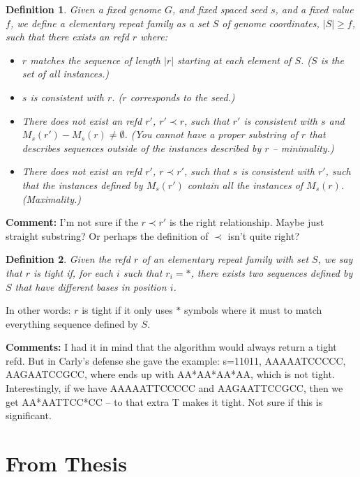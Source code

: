 \documentclass{article}
\newtheorem{definition}{Definition}
\begin{document}
\begin{definition}
  Given a fixed genome $G$, and fixed spaced seed
  $s$, and a fixed value $f$, we define a elementary repeat family as
  a set $S$ of genome coordinates, $|S| \geq f$, such that there
  exists an refd $r$ where:
  \begin{itemize}
  \item $r$ matches the sequence of length $|r|$ starting at each
    element of $S$.  ($S$ is the set of all instances.)
  \item $s$ is consistent with $r$.  ($r$ corresponds to the seed.)
  \item There does not exist an refd $r'$, $r' \prec r$,  such that $r'$
    is consistent with $s$ and $M_s(r') - M_s(r) \neq \emptyset$.  (You
    cannot have a proper substring of $r$ that describes sequences
    outside of the instances described by $r$ -- minimality.)
  \item There does not exist an refd $r'$, $r \prec r'$, such that $s$ is consistent
    with $r'$, such that the instances defined by $M_s(r')$ contain all the
    instances of $M_s(r)$.  (Maximality.)
  \end{itemize}
\end{definition}
 {\bf Comment:} I'm not sure if the $r \prec r'$ is the right
 relationship.  Maybe just straight substring?  Or perhaps the
 definition of $\prec$ isn't quite right?


\begin{definition}
Given the refd $r$ of an elementary repeat family with set $S$, we say
that $r$ is {\it tight} if, for each $i$ such that $r_i = *$, there
exists two sequences defined by $S$ that have different bases in
position $i$.
\end{definition}
In other words: $r$ is tight if it only uses $*$ symbols where it must
to match everything sequence defined by $S$.

{\bf Comments:} I had it in mind that the algorithm would always
return a tight refd.  But in Carly's defense she gave the example:
s=11011, AAAAATCCCCC, AAGAATCCGCC, where ends up with AA*AA*AA*AA,
which is not tight.  Interestingly, if we have AAAAATTCCCCC and
AAGAATTCCGCC, then we get AA*AATTCC*CC -- to that extra T makes it
tight.  Not sure if this is significant.

\section{From Thesis}
\end{document}
